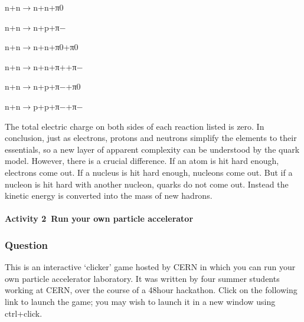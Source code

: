 \documentclass[letterpaper,10pt,english]{sphinxmanual}
\begin{document}
n+n\(\rightarrow\)n+n+π0









n+n\(\rightarrow\)n+p+π−









n+n\(\rightarrow\)n+n+π0+π0









n+n\(\rightarrow\)n+n+π++π−









n+n\(\rightarrow\)n+p+π−+π0









n+n\(\rightarrow\)p+p+π−+π−









The total electric charge on both sides of each reaction listed is zero. In conclusion, just as electrons, protons and neutrons simplify the elements to their essentials, so a new layer of apparent complexity can be understood by the quark model. However, there is a crucial difference. If an atom is hit hard enough, electrons come out. If a nucleus is hit hard enough, nucleons come out. But if a nucleon is hit hard with another nucleon, quarks do not come out. Instead the kinetic energy is
converted into the mass of new hadrons.


\paragraph{Activity 2 Run your own particle accelerator}
\label{\detokenize{content/session_00/Part_00_05:Activity-2_xa0Run-your-own-particle-accelerator}}


\subsubsection{Question}
\label{\detokenize{content/session_00/Part_00_05:id3}}
This is an interactive ‘clicker’ game hosted by CERN in which you can run your own particle accelerator laboratory. It was written by four summer students working at CERN, over the course of a 48\sphinxhyphen{}hour hackathon. Click on the following link to launch the game; you may wish to launch it in a new window using ctrl+click.
\end{document}
